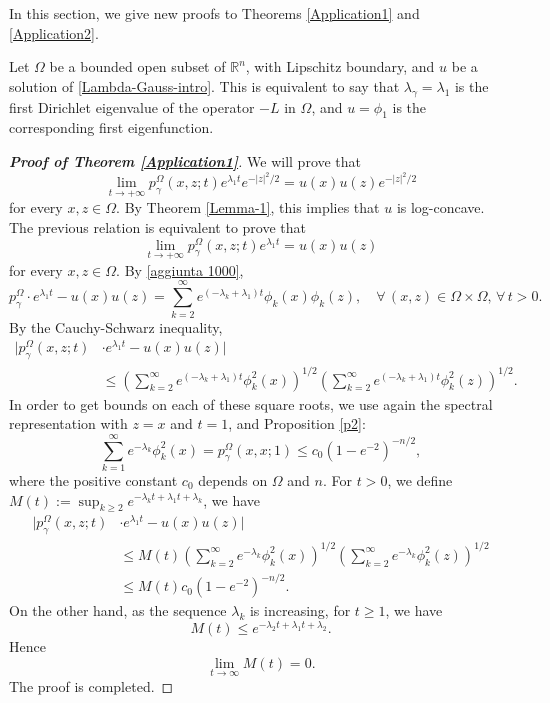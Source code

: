 \documentclass[12pt]{amsart}
\newcommand{\R}{\mathbb R}
\newcommand{\1}{\mathbf 1}
\begin{document}
In this section, we give new proofs to Theorems \ref{Application1} and \ref{Application2}.

Let $\Omega$ be a bounded open subset of $\R^n$, with Lipschitz boundary, and $u$ be a solution of \eqref{Lambda-Gauss-intro}. This is equivalent to say that $\lambda_\gamma=\lambda_1$ is the first Dirichlet eigenvalue of the operator $-L$ in $\Omega$, and $u=\phi_1$ is the corresponding first eigenfunction.

\begin{proof}[\bf Proof of Theorem \ref{Application1}]
We will prove that
$$
\lim_{t\to+\infty}p_\gamma^{\Omega}(x,z;t)e^{\lambda_1 t}e^{-|z|^2/2}=u(x)u(z)e^{-|z|^2/2}
$$
for every $x,z\in\Omega$. By Theorem \ref{Lemma-1}, this implies that $u$ is log-concave. The previous relation is equivalent to prove that
$$
\lim_{t\to+\infty}p_\gamma^{\Omega}(x,z;t)e^{\lambda_1 t}=u(x)u(z)
$$
for every $x,z\in\Omega$. By \eqref{aggiunta 1000},
\[
p^{\Omega}_\gamma\cdot e^{\lambda_1 t}-u(x)u(z)=\mathop{\sum}_{k=2}^{\infty} e^{(-\lambda_k+\lambda_1) t} \phi_{k}(x)\phi_{k}(z), \quad\forall\,(x,z)\in\Omega\times\Omega,\, \forall\, t>0.
\]
By the Cauchy-Schwarz inequality,
\begin{align*}
|p^\Omega_{\gamma}(x,z;t)&\cdot e^{\lambda_1t}-u(x)u(z)|\\
&\leq  \left( \mathop{\sum}_{k=2}^{\infty}  e^{(-\lambda_k +\lambda_1) t}\phi^2_{k}(x) \right)^{1/2} \left( \mathop{\sum}_{k=2}^{\infty}  e^{(-\lambda_k +\lambda_1) t}\phi^2_{k}(z) \right)^{1/2} .
\end{align*}
In order to get bounds on each of these square roots, we use again the spectral representation with $z=x$ and $t=1$, and Proposition \ref{p2}:
\begin{equation}\label{Kac-(9.9)}
\mathop{\sum}_{k=1}^{\infty}  e^{-\lambda_k }\phi^2_{k}(x)=p^\Omega_{\gamma}(x,x;1)\leq c_0 (1-e^{-2})^{-n/2},
\end{equation}
where the positive constant $c_0$ depends on $\Omega$ and $n$. For $t>0$, we define $M(t):=\sup_{k\geq 2}e^{-\lambda_kt+\lambda_1t+\lambda_k}$, we have
\begin{align*}
|p_{\gamma}^{\Omega}(x,z;t)&\cdot e^{\lambda_1t}-u(x)u(z)|\\
&\leq  M(t)\left( \mathop{\sum}_{k=2}^{\infty}  e^{-\lambda_k }\phi^2_{k}(x) \right)^{1/2} \left( \mathop{\sum}_{k=2}^{\infty} e^{-\lambda_k  }\phi^2_{k}(z) \right)^{1/2} \\
&\leq M(t)c_0 (1-e^{-2})^{-n/2}.
\end{align*}
On the other hand, as the sequence $\lambda_k$ is increasing, for $t\ge1$, we have
$$
M(t)\le e^{-\lambda_2t+\lambda_1t+\lambda_2}.
$$
Hence
$$
\lim_{t\rightarrow \infty} M(t)=0.
$$
The proof is completed.
\end{proof}
\end{document}
